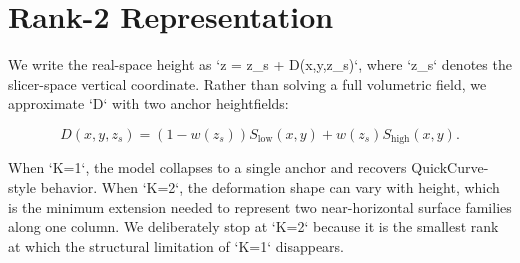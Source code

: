 \section{Rank-2 Representation}

We write the real-space height as `z = z_s + D(x,y,z_s)`, where `z_s` denotes the slicer-space vertical coordinate. Rather than solving a full volumetric field, we approximate `D` with two anchor heightfields:

\[
D(x,y,z_s) = (1-w(z_s)) S_{\text{low}}(x,y) + w(z_s) S_{\text{high}}(x,y).
\]

When `K=1`, the model collapses to a single anchor and recovers QuickCurve-style behavior. When `K=2`, the deformation shape can vary with height, which is the minimum extension needed to represent two near-horizontal surface families along one column. We deliberately stop at `K=2` because it is the smallest rank at which the structural limitation of `K=1` disappears.
